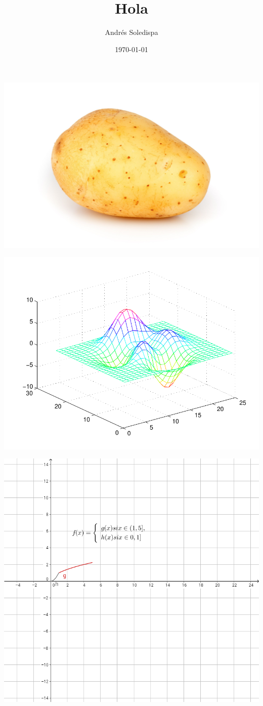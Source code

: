 \documentclass[a4paper,12pt]{article}
\author{Andrés Soledispa}
\title{Hola}
\date{\today}
\begin{document}
\maketitle
\begin{center}
\includegraphics[scale=0.1]{papa}
\end{center}

\begin{center}
 \includegraphics[scale=2,width=17cm,angle=36.27]{figure1}
\end{center}

\begin{center}
\includegraphics[scale=1]{figura2}
\end{center}
\end{document}
